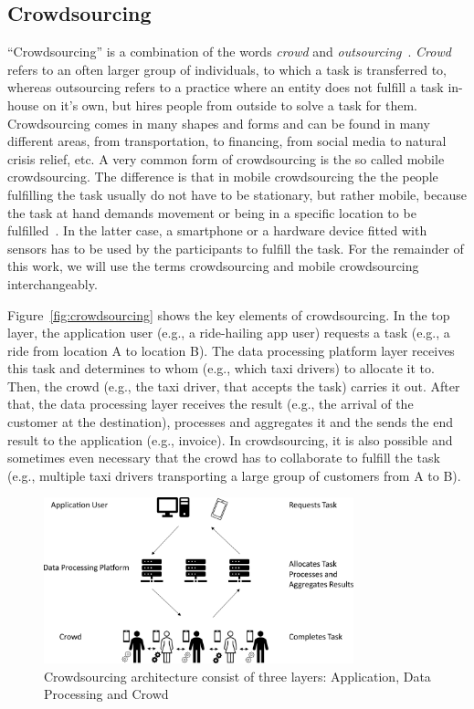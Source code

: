 \subsection*{Crowdsourcing}
``Crowdsourcing'' is a combination of the words \textit{crowd} and \textit{outsourcing}~\cite{howe2006rise}.
\textit{Crowd} refers to an often larger group of individuals, to which a task is transferred to, whereas outsourcing refers to a practice where an entity does not fulfill a task in-house on it's own, but hires people from outside to solve a task for them.
Crowdsourcing comes in many shapes and forms and can be found in many different areas, from transportation, to financing, from social media to natural crisis relief, etc.
A very common form of crowdsourcing is the so called mobile crowdsourcing.
The difference is that in mobile crowdsourcing the the people fulfilling the task usually do not have to be stationary, but rather mobile, because the task at hand demands movement or being in a specific location to be fulfilled~\cite{phuttharak2018review}.
In the latter case, a smartphone or a hardware device fitted with sensors has to be used by the participants to fulfill the task.
For the remainder of this work, we will use the terms crowdsourcing and mobile crowdsourcing interchangeably.

Figure~\ref{fig:crowdsourcing} shows the key elements of crowdsourcing.
In the top layer, the application user (e.g., a ride-hailing app user) requests a task (e.g., a ride from location A to location B).
The data processing platform layer receives this task and determines to whom (e.g., which taxi drivers) to allocate it to.
Then, the crowd (e.g., the taxi driver, that accepts the task) carries it out.
After that, the data processing layer receives the result (e.g., the arrival of the customer at the destination), processes and aggregates it and the sends the end result to the application (e.g., invoice).
In crowdsourcing, it is also possible and sometimes even necessary that the crowd has to collaborate to fulfill the task (e.g., multiple taxi drivers transporting a large group of customers from A to B).

\begin{figure}[htbp]
  \centering
  \includegraphics[width=0.8\textwidth]{fig/crowdsourcing.pdf}
  \caption{Crowdsourcing architecture consist of three layers: Application, Data Processing and Crowd}
\end{figure}
\label{fig:crowdsourcing}

